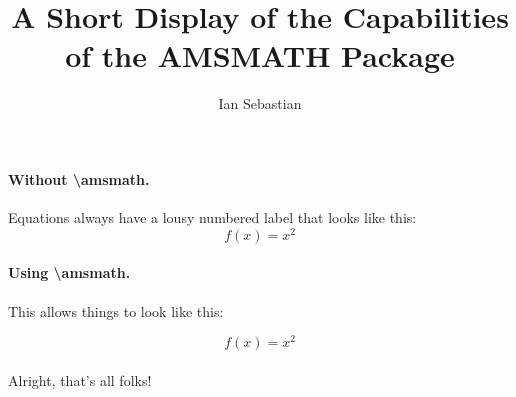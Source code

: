 \documentclass{article}
\title{A Short Display of the Capabilities of the AMSMATH Package}
\author{Ian Sebastian}
\begin{document}
	\maketitle


	\paragraph{Without \textbackslash amsmath.}
	Equations always have a lousy numbered label that looks like this:
	\begin{equation}
		f(x) = x^2
	\end{equation}
	
	
	
	\paragraph{Using \textbackslash amsmath.} 
	This allows things to look like this:
	

	\begin{equation*}
		f(x) = x^2
	\end{equation*}
	
	\paragraph{}
	Alright, that's all folks!
\end{document}

